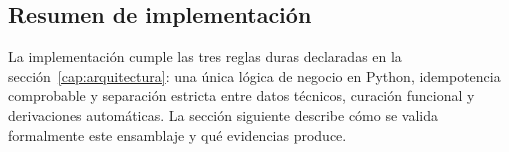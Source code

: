 \subsection{Resumen de implementación}

La implementación cumple las tres reglas duras declaradas en la sección~\ref{cap:arquitectura}: una única lógica de negocio en Python, idempotencia comprobable y separación estricta entre datos técnicos, curación funcional y derivaciones automáticas. La sección siguiente describe cómo se valida formalmente este ensamblaje y qué evidencias produce.
